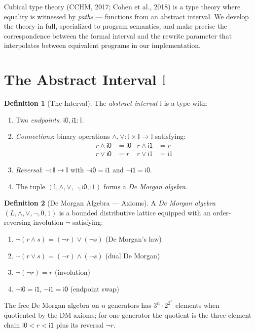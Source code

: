 \documentclass[11pt,a4paper]{report}
\theoremstyle{definition}
\newtheorem{definition}{Definition}[chapter]
\theoremstyle{plain}
\newcommand{\interval}{\mathbb{I}}
\begin{document}
Cubical type theory (CCHM, 2017; Cohen et al., 2018) is a type theory
where equality is witnessed by \emph{paths} --- functions from an
abstract interval.  We develop the theory in full, specialized to
program semantics, and make precise the correspondence between the
formal interval and the rewrite parameter that interpolates between
equivalent programs in our implementation.

\section{The Abstract Interval $\interval$}

\begin{definition}[The Interval]
\label{def:interval}
The \emph{abstract interval} $\interval$ is a type with:
\begin{enumerate}
  \item Two \emph{endpoints}: $\mathsf{i0}, \mathsf{i1} : \interval$.
  \item \emph{Connections}: binary operations $\land, \lor : \interval
    \times \interval \to \interval$ satisfying:
    \begin{align}
      r \land \mathsf{i0} &= \mathsf{i0} &
      r \land \mathsf{i1} &= r \\
      r \lor \mathsf{i0} &= r &
      r \lor \mathsf{i1} &= \mathsf{i1}
    \end{align}
  \item \emph{Reversal}: $\lnot : \interval \to \interval$ with
    $\lnot \mathsf{i0} = \mathsf{i1}$ and
    $\lnot \mathsf{i1} = \mathsf{i0}$.
  \item The tuple $(\interval, \land, \lor, \lnot, \mathsf{i0},
    \mathsf{i1})$ forms a \emph{De Morgan algebra}.
\end{enumerate}
\end{definition}

\begin{definition}[De Morgan Algebra --- Axioms]
\label{def:demorgan}
A \emph{De Morgan algebra} $(L, \land, \lor, \lnot, 0, 1)$ is a bounded
distributive lattice equipped with an order-reversing involution
$\lnot$ satisfying:
\begin{enumerate}[label=\textup{(DM\arabic*)}]
  \item $\lnot(r \land s) = (\lnot r) \lor (\lnot s)$
    \hfill (De Morgan's law)
  \item $\lnot(r \lor s) = (\lnot r) \land (\lnot s)$
    \hfill (dual De Morgan)
  \item $\lnot(\lnot r) = r$
    \hfill (involution)
  \item $\lnot \mathsf{i0} = \mathsf{i1}$,\;
    $\lnot \mathsf{i1} = \mathsf{i0}$
    \hfill (endpoint swap)
\end{enumerate}
The free De Morgan algebra on $n$ generators has $3^n \cdot 2^{2^n}$
elements when quotiented by the DM axioms; for one generator
the quotient is the three-element chain
$\mathsf{i0} < r < \mathsf{i1}$ plus its reversal $\lnot r$.
\end{definition}
\end{document}
